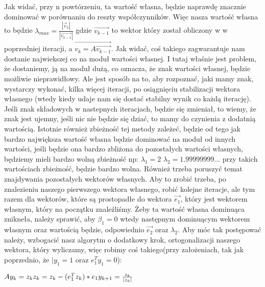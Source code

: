 \documentclass[12pt]{article}
\begin{document}
Jak widać, przy n powtórzeniu, ta wartość własna, będzie naprawdę znacznie dominować w porównaniu do reszty współczynników. Więc nasza wartość własna to będzie $\lambda_{max} = \frac{|\vec{v}_{k}|}{|\vec{v_{k-1}}|}$ gdzie $\vec{v_{k-1}}$ to wektor który został obliczony w w poprzedniej iteracji, a $\vec{v_{k} = A\vec{v_{k-1}}}$. Jak widać, coś takiego zagwarantuje nam dostanie najwiekszej co na moduł wartości własnej. I tutaj właśnie jest problem, że dostaniemy, ją na moduł dużą, co oznacza, że znak wartości własnej, będzie możliwie nieprawidłowy. Ale jest sposób na to, aby rozpoznać, jaki mamy znak, wystarczy wykonać, kilka więcej iteracji, po osiągnięciu stabilizacji wektora własnego (wtedy kiedy udaje nam się dostać stabilny wynik co każdą iterację).  Jeśli znak składowych w nastepnych iteracjach, będzie się zmieniał, to wiemy, że znak jest ujemny, jeśli nic nie będzie się dziać, to mamy do czynienia z dodatnią wartością. Istotnie również zbieżność tej metody zależeć, będzie od tego jak bardzo największa wartość własna będzie dominować na moduł od innych wartości, jeśli będzie ona bardzo zbliżona do pozostałych wartości własnych, będziemy mieli bardzo wolną zbieżność np: $\lambda_{1} = 2$ $\lambda_{2} = 1.99999999...$ przy takich wartościach zbieżność, będzie bardzo wolna. Również trzeba poruszyć temat znajdywania pozostałych wektorów własnych. Aby to zrobić trzeba, po znalezieniu naszego pierwszego wektora własnego, robić kolejne iteracje, ale tym razem dla wektorów, które są prostopadłe do wektora $\vec{e_{1}}$, który jest wektorem własnym, który na początku znaleźliśmy. Żeby ta wartość własna dominuąca znikneła, należy sprawić, aby $\beta_{1} = 0$ wtedy następnym dominuącym wektorem własnym oraz wartością będzie, odpowiednio $\vec{e_{2}}$ oraz $\lambda_{2}$. Aby móc tak postępować należy, wzbogacić nasz algorytm o dodatkowy krok, ortogonalizacji naszego wektora, który wyliczamy, więc robimy coś takiego(przy założeniach, tak jak poprzednio, że $|y_{1} = 1$ oraz $e_{1}^{T}y_{1} = 0$):
\begin{center}
    \begin{math}
        Ay_{k} = z_{k} \newline
        z_{k} = z_{k} - (e_{1}^{T}z_{k})*e_{1} \newline
        y_{k+1} = \frac{z_{k}}{|z_{k}|} \newline
    \end{math}
\end{center}
\end{document}
